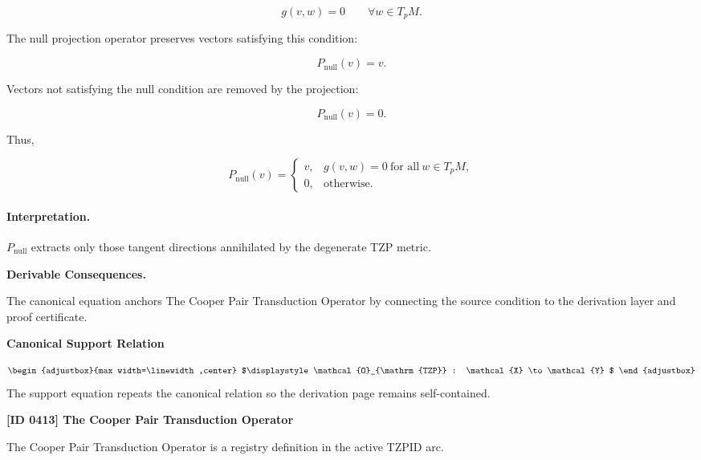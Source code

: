 \begin{equation}
g(v,w)=0
\qquad
\forall w\in T_pM .
\end{equation}

The null projection operator preserves vectors satisfying this condition:

\begin{equation}
P_{\mathrm{null}}(v)=v .
\end{equation}

Vectors not satisfying the null condition are removed by the projection:

\begin{equation}
P_{\mathrm{null}}(v)=0 .
\end{equation}

Thus,

\begin{equation}
\boxed{
P_{\mathrm{null}}(v)
=
\begin{cases}
v, & g(v,w)=0\ \text{for all}\ w\in T_pM,\\
0, & \text{otherwise}.
\end{cases}
}
\end{equation}

\paragraph{Interpretation.}
$P_{\mathrm{null}}$ extracts only those tangent directions annihilated by the degenerate TZP metric.

\par\vspace{0.35em}
\noindent\textbf{Derivable Consequences.}\quad
\begingroup
\footnotesize
\raggedright
The canonical equation anchors The Cooper Pair Transduction Operator by connecting the source condition to the derivation layer and proof certificate.
\par\endgroup

\noindent\textbf{Canonical Support Relation}\par
\[
\begin{adjustbox}{max width=\linewidth,center}
$\displaystyle
\mathcal{O}_{\mathrm{TZP}} : \mathcal{X} \to \mathcal{Y}
$
\end{adjustbox}
\]
\noindent The support equation repeats the canonical relation so the derivation page remains self-contained.\par

\clearpage
\noindent\textbf{[ID 0413] The Cooper Pair Transduction Operator}\par
\vspace{0.35em}
\begingroup\small
{}
The Cooper Pair Transduction Operator is a registry definition in the active TZPID arc.

